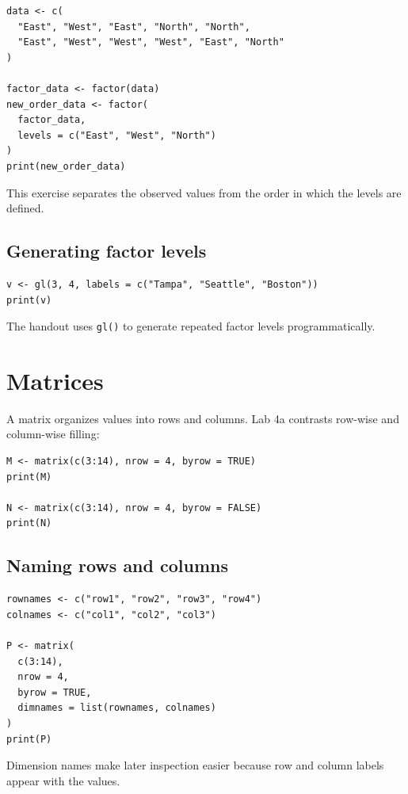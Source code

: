 \begin{lstlisting}[style=dsr]
data <- c(
  "East", "West", "East", "North", "North",
  "East", "West", "West", "West", "East", "North"
)

factor_data <- factor(data)
new_order_data <- factor(
  factor_data,
  levels = c("East", "West", "North")
)
print(new_order_data)
\end{lstlisting}

This exercise separates the observed values from the order in which the levels are defined.

\subsection{Generating factor levels}

\begin{lstlisting}[style=dsr]
v <- gl(3, 4, labels = c("Tampa", "Seattle", "Boston"))
print(v)
\end{lstlisting}

The handout uses \texttt{gl()} to generate repeated factor levels programmatically.

\section{Matrices}

A matrix organizes values into rows and columns. Lab 4a contrasts row-wise and column-wise filling:

\begin{lstlisting}[style=dsr]
M <- matrix(c(3:14), nrow = 4, byrow = TRUE)
print(M)

N <- matrix(c(3:14), nrow = 4, byrow = FALSE)
print(N)
\end{lstlisting}

\subsection{Naming rows and columns}

\begin{lstlisting}[style=dsr]
rownames <- c("row1", "row2", "row3", "row4")
colnames <- c("col1", "col2", "col3")

P <- matrix(
  c(3:14),
  nrow = 4,
  byrow = TRUE,
  dimnames = list(rownames, colnames)
)
print(P)
\end{lstlisting}

Dimension names make later inspection easier because row and column labels appear with the values.

